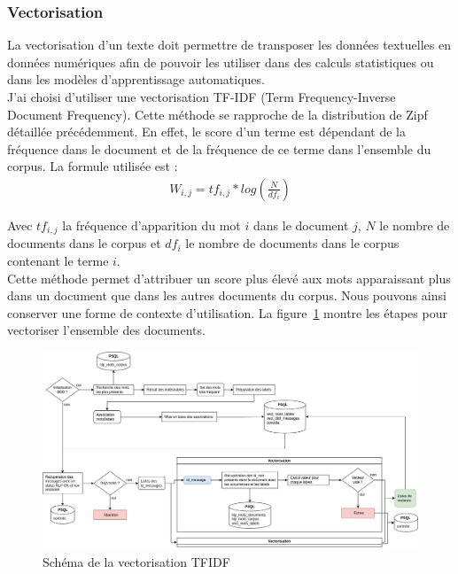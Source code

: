 	\subsubsection{Vectorisation}
	    La vectorisation d'un texte doit permettre de transposer les données textuelles en données numériques afin de
        pouvoir les utiliser dans des calculs statistiques ou dans les modèles d'apprentissage automatiques.\\
		J'ai choisi d'utiliser une vectorisation TF-IDF\cite{ml-python} (Term Frequency-Inverse Document Frequency).
        Cette méthode se rapproche de la distribution de Zipf détaillée précédemment.
        En effet, le score d'un terme est dépendant de la fréquence dans le document et de la fréquence de ce terme dans l'ensemble du corpus.
        La formule utilisée est :
        \begin{align*}
            W_{i,j} = tf_{i,j}*log(\frac{N}{df_{i}})
        \end{align*}

        Avec $tf_{i,j}$ la fréquence d'apparition du mot $i$ dans le document $j$, $N$ le nombre de documents dans le corpus et $df_{i}$ le nombre de documents dans le corpus contenant le terme $i$. \\
        Cette méthode permet d'attribuer un score plus élevé aux mots apparaissant plus dans un document que dans les autres documents du corpus.
        Nous pouvons ainsi conserver une forme de contexte d'utilisation.
        La figure~\ref{fig:tfidf} montre les étapes pour vectoriser l'ensemble des documents.

        \begin{figure}[H]
            \includegraphics[width=\linewidth]{img/tfidf}
            \caption{Schéma de la vectorisation TFIDF}
            \label{fig:tfidf}
        \end{figure}

